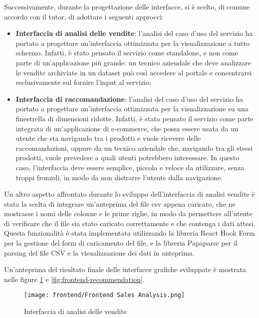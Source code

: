Successivamente, durante la progettazione delle interfacce, si è scelto, di comune accordo con il tutor, di adottare i seguenti approcci:
\begin{itemize}
    \item \textbf{Interfaccia di analisi delle vendite}: l'analisi del caso d'uso del servizio ha portato a progettare un'interfaccia ottimizzata per la visualizzazione a tutto schermo. Infatti, è stato pensato il servizio come standalone, e non come parte di un'applicazione più grande: un tecnico aziendale che deve analizzare le vendite archiviate in un dataset può così accedere al portale e concentrarsi esclusivamente sul fornire l'input al servizio;
    \item \textbf{Interfaccia di raccomandazione}: l'analisi del caso d'uso del servizio ha portato a progettare un'interfaccia ottimizzata per la visualizzazione su una finestrella di dimensioni ridotte. Infatti, è stato pensato il servizio come parte integrata di un'applicazione di e-commerce, che possa essere usata da un utente che sta navigando tra i prodotti e vuole ricevere delle raccomandazioni, oppure da un tecnico aziendale che, navigando tra gli stessi prodotti, vuole prevedere a quali utenti potrebbero interessare. In questo caso, l'interfaccia deve essere semplice, piccola e veloce da utilizzare, senza troppi fronzoli, in modo da non distrarre l'utente dalla navigazione.
\end{itemize}

Un altro aspetto affrontato durante lo sviluppo dell'interfaccia di analisi vendite è stata la scelta di integrare un'anteprima del file csv appena caricato, che ne mostrasse i nomi delle colonne e le prime righe, in modo da permettere all'utente di verificare che il file sia stato caricato correttamente e che contenga i dati attesi. Questa funzionalità è stata implementata utilizzando la libreria React Hook Form per la gestione del form di caricamento del file, e la libreria Papaparse per il parsing del file CSV e la visualizzazione dei dati in anteprima.

Un'anteprima del risultato finale delle interfacce grafiche sviluppate è mostrata nelle figure \ref{fig:frontend-sales-analysis} e \ref{fig:frontend-recommendation}.

\begin{figure}[!h]
    \centering
    \texttt{[image: frontend/Frontend Sales Analysis.png]}
    \caption{Interfaccia di analisi delle vendite}
    \label{fig:frontend-sales-analysis}
\end{figure}

